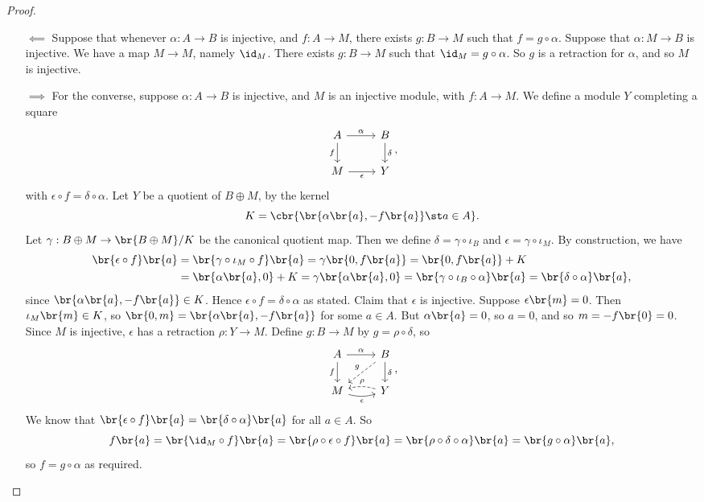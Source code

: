\begin{proof}
\hfill
\begin{itemize}
\item[$ \impliedby $] Suppose that whenever $ \alpha : A \to B $ is injective, and $ f : A \to M $, there exists $ g : B \to M $ such that $ f = g \circ \alpha $. Suppose that $ \alpha : M \to B $ is injective. We have a map $ M \to M $, namely $ \id_M $. There exists $ g : B \to M $ such that $ \id_M = g \circ \alpha $. So $ g $ is a retraction for $ \alpha $, and so $ M $ is injective.
\item[$ \implies $] For the converse, suppose $ \alpha : A \to B $ is injective, and $ M $ is an injective module, with $ f : A \to M $. We define a module $ Y $ completing a square
$$
\begin{tikzcd}
A \arrow{r}{\alpha} \arrow{d}[swap]{f} & B \arrow{d}{\delta} \\
M \arrow{r}[swap]{\epsilon} & Y
\end{tikzcd},
$$
with $ \epsilon \circ f = \delta \circ \alpha $. Let $ Y $ be a quotient of $ B \oplus M $, by the kernel
$$ K = \cbr{\br{\alpha\br{a}, -f\br{a}} \st a \in A}. $$
Let $ \gamma : B \oplus M \to \br{B \oplus M} / K $ be the canonical quotient map. Then we define $ \delta = \gamma \circ \iota_B $ and $ \epsilon = \gamma \circ \iota_M $. By construction, we have
\begin{align*}
\br{\epsilon \circ f}\br{a}
& = \br{\gamma \circ \iota_M \circ f}\br{a}
= \gamma\br{0, f\br{a}}
= \br{0, f\br{a}} + K \\
& = \br{\alpha\br{a}, 0} + K
= \gamma\br{\alpha\br{a}, 0}
= \br{\gamma \circ \iota_B \circ \alpha}\br{a}
= \br{\delta \circ \alpha}\br{a},
\end{align*}
since $ \br{\alpha\br{a}, -f\br{a}} \in K $. Hence $ \epsilon \circ f = \delta \circ \alpha $ as stated. Claim that $ \epsilon $ is injective. Suppose $ \epsilon\br{m} = 0 $. Then $ \iota_M\br{m} \in K $, so $ \br{0, m} = \br{\alpha\br{a}, -f\br{a}} $ for some $ a \in A $. But $ \alpha\br{a} = 0 $, so $ a = 0 $, and so $ m = -f\br{0} = 0 $. Since $ M $ is injective, $ \epsilon $ has a retraction $ \rho : Y \to M $. Define $ g : B \to M $ by $ g = \rho \circ \delta $, so
$$
\begin{tikzcd}
A \arrow{r}{\alpha} \arrow{d}[swap]{f} & B \arrow[dashed]{dl}[swap]{g} \arrow{d}{\delta} \\
M \arrow[bend right=15]{r}[swap]{\epsilon} & Y \arrow[bend right=15, dashed]{l}[swap]{\rho}
\end{tikzcd},
$$
We know that $ \br{\epsilon \circ f}\br{a} = \br{\delta \circ \alpha}\br{a} $ for all $ a \in A $. So
$$ f\br{a} = \br{\id_M \circ f}\br{a} = \br{\rho \circ \epsilon \circ f}\br{a} = \br{\rho \circ \delta \circ \alpha}\br{a} = \br{g \circ \alpha}\br{a}, $$
so $ f = g \circ \alpha $ as required.
\end{itemize}
\end{proof}

